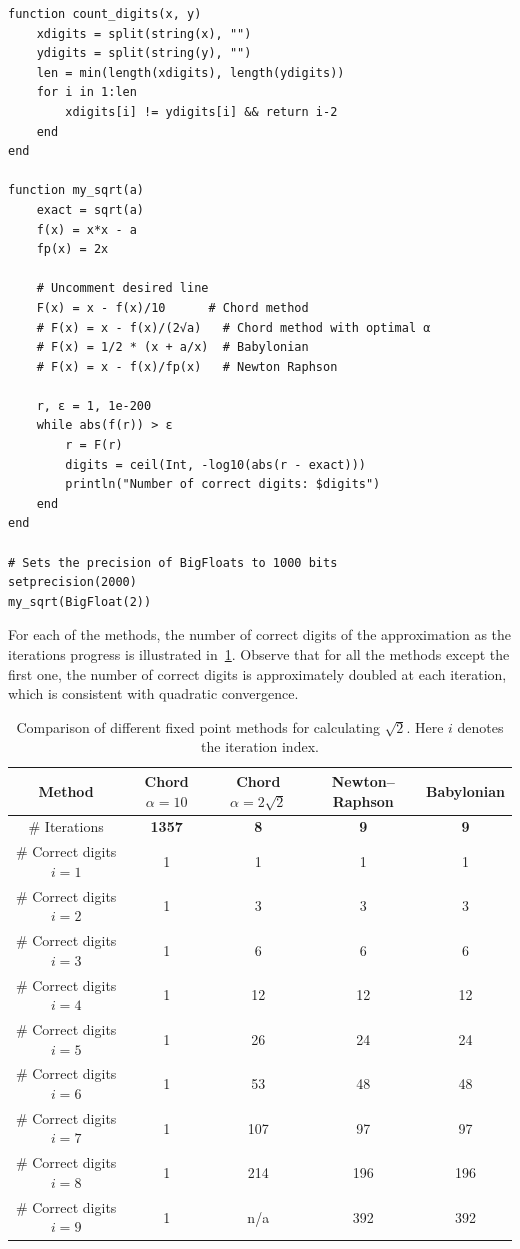 \begin{verbatim}
function count_digits(x, y)
    xdigits = split(string(x), "")
    ydigits = split(string(y), "")
    len = min(length(xdigits), length(ydigits))
    for i in 1:len
        xdigits[i] != ydigits[i] && return i-2
    end
end

function my_sqrt(a)
    exact = sqrt(a)
    f(x) = x*x - a
    fp(x) = 2x

    # Uncomment desired line
    F(x) = x - f(x)/10      # Chord method
    # F(x) = x - f(x)/(2√a)   # Chord method with optimal α
    # F(x) = 1/2 * (x + a/x)  # Babylonian
    # F(x) = x - f(x)/fp(x)   # Newton Raphson

    r, ε = 1, 1e-200
    while abs(f(r)) > ε
        r = F(r)
        digits = ceil(Int, -log10(abs(r - exact)))
        println("Number of correct digits: $digits")
    end
end

# Sets the precision of BigFloats to 1000 bits
setprecision(2000)
my_sqrt(BigFloat(2))
\end{verbatim}
For each of the methods,
the number of correct digits of the approximation as the iterations progress is illustrated in~\cref{table:numerical_experiment_square_root}.
Observe that for all the methods except the first one,
the number of correct digits is approximately doubled at each iteration,
which is consistent with quadratic convergence.
\begin{table}[ht]
    \centering
    \begin{tabular}{|c|c|c|c|c|}
         \hline
         Method & Chord $\alpha = 10$ & Chord $\alpha = 2 \sqrt{2}$ & Newton--Raphson & Babylonian
         \\ \hline
         \# Iterations & \textbf{1357} & \textbf{8} & \textbf{9} & \textbf{9}
         \\ \hline
         \# Correct digits $i = 1$ & 1 & 1 & 1 & 1
         \\ \hline
         \# Correct digits $i = 2$ & 1 & 3 & 3 & 3
         \\ \hline
         \# Correct digits $i = 3$ & 1 & 6 & 6 & 6
         \\ \hline
         \# Correct digits $i = 4$ & 1 & 12 & 12 & 12
         \\ \hline
         \# Correct digits $i = 5$ & 1 & 26 & 24 & 24
         \\ \hline
         \# Correct digits $i = 6$ & 1 & 53 & 48 & 48
         \\ \hline
         \# Correct digits $i = 7$ & 1 & 107 & 97 & 97
         \\ \hline
         \# Correct digits $i = 8$ & 1 & 214 & 196 & 196
         \\ \hline
         \# Correct digits $i = 9$ & 1 & n/a & 392 & 392
         \\ \hline
    \end{tabular}
    \caption{%
        Comparison of different fixed point methods for calculating $\sqrt{2}$.
        Here $i$ denotes the iteration index.
    }
    \label{table:numerical_experiment_square_root}
\end{table}
